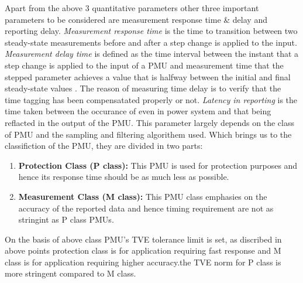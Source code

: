 Apart from the above 3 quantitative parameters other three important parameters to be considered are measurement response time \& delay and reporting delay. \textit{Measurement response time} is the time to transition between two steady-state measurements before and after a step change is applied to the input. \textit{Measurement delay time} is defined as the time interval between the instant that a step change is applied to the input of a PMU and measurement time that the stepped parameter achieves a value that is halfway between the initial and final steady-state values \cite{std:c37}. The reason of measuring time delay is to verify that the time tagging has been compensatated properly or not.  \textit{Latency in reporting} is the time taken between the occurance of even in power system and that being reflacted in the output of the PMU. This parameter largely depends on the class of PMU and the sampling and filtering algorithem used. Which brings us to the classifiction of the PMU, they are divided in two parts:
\begin{enumerate}
\item \textbf{Protection Class (P class):} This PMU is used for protection purposes and hence its response time should be as much less as possible.
\item \textbf{Measurement Class (M class):}  This PMU class emphasies on the accuracy of the reported data and hence timing requirement are not as stringint as P class PMUs.
\end{enumerate} 

On the basis of above class PMU's TVE tolerance limit is set, as discribed in above points protection class is for application requiring fast response and M class is for application requiring higher accuracy.the TVE norm for P class is more stringent compared to M class. 

